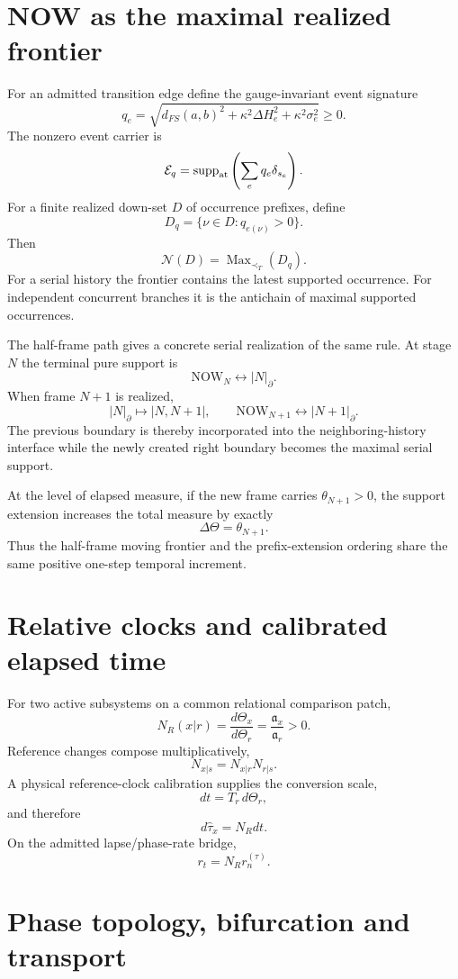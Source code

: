 \documentclass[11pt]{book}
\begin{document}
\section{NOW as the maximal realized frontier}

For an admitted transition edge define the gauge-invariant event signature
\[
\boxed{
q_e=
\sqrt{
 d_{FS}(a,b)^2+
 \kappa^2\Delta H_e^2+
 \kappa^2\sigma_e^2
 }\ge0.
}
\]
The nonzero event carrier is
\[
\mathcal E_q
=\operatorname{supp}_{\rm at}
\left(\sum_e q_e\delta_{s_e}\right).
\]
For a finite realized down-set $D$ of occurrence prefixes, define
\[
D_q=\{\nu\in D:q_{e(\nu)}>0\}.
\]
Then
\[
\boxed{
\mathcal N(D)
=\operatorname{Max}_{\prec_T}(D_q).
}
\]
For a serial history the frontier contains the latest supported occurrence. For independent concurrent branches it is the antichain of maximal supported occurrences.

The half-frame path gives a concrete serial realization of the same rule. At stage $N$ the terminal pure support is
\[
\boxed{\mathrm{NOW}_N\leftrightarrow|N|_\partial.}
\]
When frame $N+1$ is realized,
\[
\boxed{
|N|_\partial
\longmapsto
|N,N+1|,
\qquad
\mathrm{NOW}_{N+1}\leftrightarrow|N+1|_\partial.
}
\]
The previous boundary is thereby incorporated into the neighboring-history interface while the newly created right boundary becomes the maximal serial support.

At the level of elapsed measure, if the new frame carries $\theta_{N+1}>0$, the support extension increases the total measure by exactly
\[
\boxed{\Delta\Theta=\theta_{N+1}.}
\]
Thus the half-frame moving frontier and the prefix-extension ordering share the same positive one-step temporal increment.

\section{Relative clocks and calibrated elapsed time}

For two active subsystems on a common relational comparison patch,
\[
\boxed{
N_R(x|r)
=\frac{d\Theta_x}{d\Theta_r}
=\frac{\mathfrak a_x}{\mathfrak a_r}>0.
}
\]
Reference changes compose multiplicatively,
\[
N_{x|s}=N_{x|r}N_{r|s}.
\]
A physical reference-clock calibration supplies the conversion scale,
\[
\boxed{dt=T_r\,d\Theta_r,}
\]
and therefore
\[
\boxed{d\hat\tau_x=N_Rdt.}
\]
On the admitted lapse/phase-rate bridge,
\[
\boxed{r_t=N_Rr_n^{(\tau)}.}
\]

\section{Phase topology, bifurcation and transport}
\end{document}
